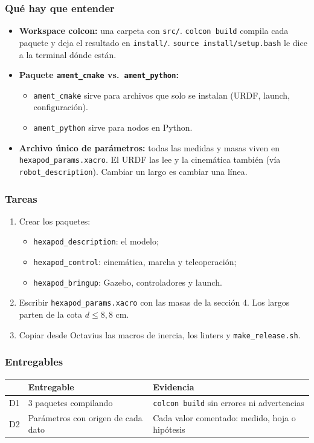 \documentclass[11pt,a4paper]{article}
\begin{document}
\subsubsection{Qué hay que entender}
\begin{itemize}
  \item \textbf{Workspace colcon:} una carpeta con \texttt{src/}. \texttt{colcon build} compila cada paquete y deja el resultado en \texttt{install/}. \texttt{source install/setup.bash} le dice a la terminal dónde están.
  \item \textbf{Paquete \texttt{ament\_cmake} vs.\ \texttt{ament\_python}:}
  \begin{itemize}
    \item \texttt{ament\_cmake} sirve para archivos que solo se instalan (URDF, launch, configuración).
    \item \texttt{ament\_python} sirve para nodos en Python.
  \end{itemize}
  \item \textbf{Archivo único de parámetros:} todas las medidas y masas viven en \texttt{hexapod\_params.xacro}. El URDF las lee y la cinemática también (vía \texttt{robot\_description}). Cambiar un largo es cambiar una línea.
\end{itemize}

\subsubsection{Tareas}
\begin{enumerate}[label=T\arabic*]
  \item Crear los paquetes:
  \begin{itemize}
    \item \texttt{hexapod\_description}: el modelo;
    \item \texttt{hexapod\_control}: cinemática, marcha y teleoperación;
    \item \texttt{hexapod\_bringup}: Gazebo, controladores y launch.
  \end{itemize}
  \item Escribir \texttt{hexapod\_params.xacro} con las masas de la sección 4. Los largos parten de la cota $d \leq 8{,}8$ cm.
  \item Copiar desde Octavius las macros de inercia, los linters y \texttt{make\_release.sh}.
\end{enumerate}

\subsubsection{Entregables}
\begin{tabularx}{\linewidth}{@{}l Y Y@{}}
\toprule \textbf{} & \textbf{Entregable} & \textbf{Evidencia}\\ \midrule
D1 & 3 paquetes compilando & \texttt{colcon build} sin errores ni advertencias\\
D2 & Parámetros con origen de cada dato & Cada valor comentado: medido, hoja o hipótesis\\
\bottomrule
\end{tabularx}
\end{document}
